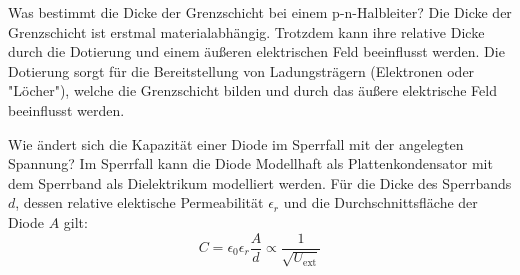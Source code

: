\documentclass{article}
\theoremstyle{definition}
\begin{document}
    \begin{voraufgabe}{Was bestimmt die Dicke der Grenzschicht bei einem p-n-Halbleiter?}
        Die Dicke der Grenzschicht ist erstmal materialabhängig. Trotzdem kann ihre relative Dicke durch die Dotierung und einem äußeren elektrischen Feld beeinflusst werden.
        Die Dotierung sorgt für die Bereitstellung von Ladungsträgern (Elektronen oder "Löcher"), welche die Grenzschicht bilden und durch das äußere elektrische Feld beeinflusst werden.
    \end{voraufgabe}
    \begin{voraufgabe}{Wie ändert sich die Kapazität einer Diode im Sperrfall mit der angelegten Spannung?}
        Im Sperrfall kann die Diode Modellhaft als Plattenkondensator mit dem Sperrband als Dielektrikum modelliert werden.
         Für die Dicke des Sperrbands $d$, dessen relative elektische Permeabilität $\epsilon_r$ und die Durchschnittsfläche 
         der Diode $A$ gilt:
        \begin{equation}
            C = \epsilon_0 \epsilon_r \frac{A}{d} \propto \frac{1}{\sqrt{U_\mathrm{ext}}}
            \label{Kapazität einer Diode}
        \end{equation}
    \end{voraufgabe}
    
\end{document}
